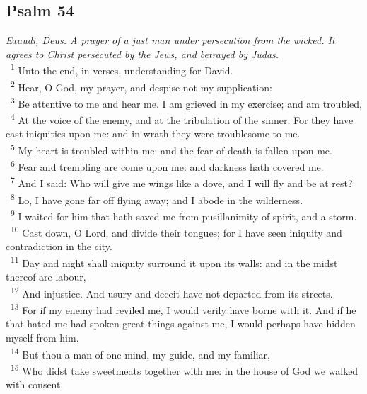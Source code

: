 \documentclass[a5paper,12pt]{article}
\begin{document}
\begin{multicols*}{2}
\section{Psalm 54}
\label{sec:orgb70f7a9}
\emph{Exaudi, Deus. A prayer of a just man under persecution from the wicked. It agrees to Christ persecuted by the Jews, and betrayed by Judas.}\\

~\textsuperscript{1} Unto the end, in verses, understanding for David.\\
~\textsuperscript{2} Hear, O God, my prayer, and despise not my supplication:\\
~\textsuperscript{3} Be attentive to me and hear me. I am grieved in my exercise; and am troubled,\\
~\textsuperscript{4} At the voice of the enemy, and at the tribulation of the sinner. For they have cast iniquities upon me: and in wrath they were troublesome to me.\\
~\textsuperscript{5} My heart is troubled within me: and the fear of death is fallen upon me.\\
~\textsuperscript{6} Fear and trembling are come upon me: and darkness hath covered me.\\
~\textsuperscript{7} And I said: Who will give me wings like a dove, and I will fly and be at rest?\\
~\textsuperscript{8} Lo, I have gone far off flying away; and I abode in the wilderness.\\
~\textsuperscript{9} I waited for him that hath saved me from pusillanimity of spirit, and a storm.\\
~\textsuperscript{10} Cast down, O Lord, and divide their tongues; for I have seen iniquity and contradiction in the city.\\
~\textsuperscript{11} Day and night shall iniquity surround it upon its walls: and in the midst thereof are labour,\\
~\textsuperscript{12} And injustice. And usury and deceit have not departed from its streets.\\
~\textsuperscript{13} For if my enemy had reviled me, I would verily have borne with it. And if he that hated me had spoken great things against me, I would perhaps have hidden myself from him.\\
~\textsuperscript{14} But thou a man of one mind, my guide, and my familiar,\\
~\textsuperscript{15} Who didst take sweetmeats together with me: in the house of God we walked with consent.\\

\end{multicols*}
\end{document}
